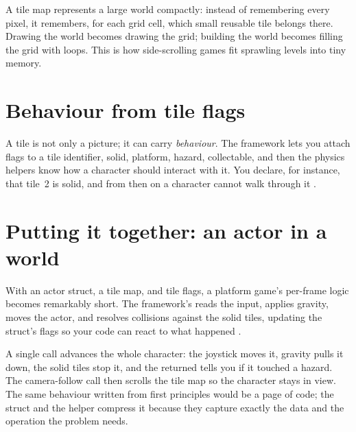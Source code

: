 

\begin{prgconcept}
A tile map represents a large world compactly: instead of remembering every pixel,
it remembers, for each grid cell, which small reusable tile belongs there. Drawing
the world becomes drawing the grid; building the world becomes filling the grid
with loops. This is how side-scrolling games fit sprawling levels into tiny
memory.
\end{prgconcept}

\section{Behaviour from tile flags}

A tile is not only a picture; it can carry \emph{behaviour}. The framework lets you
attach flags to a tile identifier, solid, platform, hazard, collectable, and then
the physics helpers know how a character should interact with it. You declare, for
instance, that tile~2 is solid, and from then on a character cannot walk through
it \citep{prg32repo}.



\section{Putting it together: an actor in a world}

With an actor struct, a tile map, and tile flags, a platform game's per-frame
logic becomes remarkably short. The framework's 
reads the input, applies gravity, moves the actor, and resolves collisions against
the solid tiles, updating the struct's  flags so your code can react
to what happened \citep{prg32repo,prg32tutorialc}.



A single call advances the whole character: the joystick moves
it, gravity pulls it down, the solid tiles stop it, and the returned 
tells you if it touched a hazard. The camera-follow call then scrolls the tile map
so the character stays in view. The same behaviour written from first principles
would be a page of code; the struct and the helper compress it because they capture
exactly the data and the operation the problem needs.

